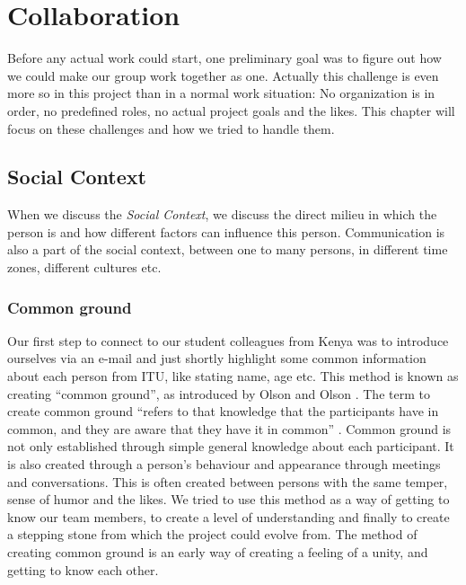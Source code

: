 \section{Collaboration} \label{sec:collaboration}
Before any actual work could start, one preliminary goal was to figure out how we could make our group work together as one. Actually this challenge is even more so in this project than in a normal work situation: No organization is in order, no predefined roles, no actual project goals and the likes. This chapter will focus on these challenges and how we tried to handle them. 

%
%
%

\subsection{Social Context} \label{subsec:socialcontext}
When we discuss the \textit{Social Context}, we discuss the direct milieu in which the person is and how different factors can influence this person. Communication is also a part of the social context, 
between one to many persons, in different time zones, different cultures etc.\\

\subsubsection{Common ground} \label{subsubsec:commonground}
Our first step to connect to our student colleagues from Kenya was to introduce ourselves via an e-mail and just shortly highlight some common information about each person from ITU, like stating name, age etc. This method is known as creating ``common ground'', as introduced by Olson and Olson \cite{olson:2000:distance}. The term to create common ground ``refers to that knowledge that the participants have in common, and they are aware that they have it in common'' \cite{olson:2000:distance}. Common ground is not only established through simple general knowledge about each participant. It is also created through a person's behaviour and appearance through meetings and conversations. This is often created between persons with the same temper, sense of humor and the likes. We tried to use this method as a way of getting to know our team members, to create a level of understanding and finally to create a stepping stone from which the project could evolve from. The method of creating common ground is an early way of creating a feeling of a unity, and getting to know each other.

